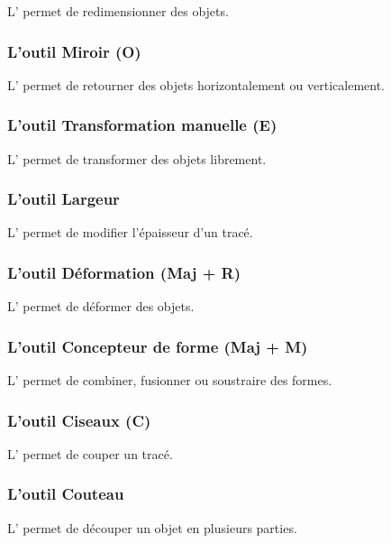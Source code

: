 L' permet de redimensionner des objets.

\subsubsection{L'outil Miroir (O)}

L' permet de retourner des objets horizontalement ou verticalement.

\subsubsection{L'outil Transformation manuelle (E)}

L' permet de transformer des objets librement.

\subsubsection{L'outil Largeur}

L' permet de modifier l'épaisseur d'un tracé.

\subsubsection{L'outil Déformation (Maj + R)}

L' permet de déformer des objets.

\subsubsection{L'outil Concepteur de forme (Maj + M)}

L' permet de combiner, fusionner ou soustraire des formes.

\subsubsection{L'outil Ciseaux (C)}

L' permet de couper un tracé.

\subsubsection{L'outil Couteau}

L' permet de découper un objet en plusieurs parties.

